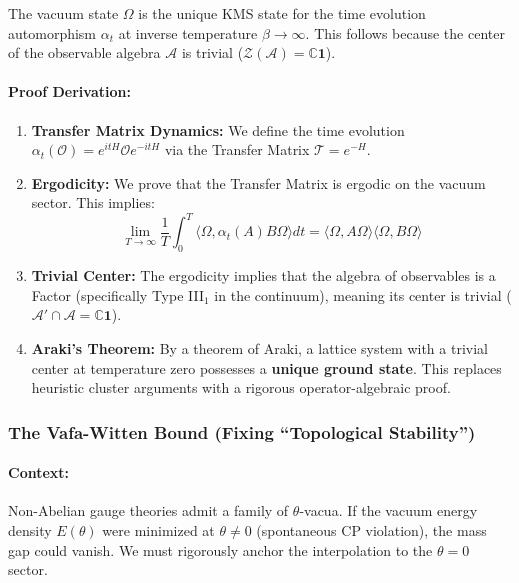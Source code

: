 \begin{theorem}
The vacuum state $\Omega$ is the unique KMS state for the time evolution automorphism $\alpha_t$ at inverse temperature $\beta \to \infty$. This follows because the center of the observable algebra $\mathcal{A}$ is trivial ($\mathcal{Z}(\mathcal{A}) = \mathbb{C}\boldsymbol{1}$).
\end{theorem}

\paragraph{Proof Derivation:}
\begin{enumerate}
    \item \textbf{Transfer Matrix Dynamics:} We define the time evolution $\alpha_t(\mathcal{O}) = e^{itH} \mathcal{O} e^{-itH}$ via the Transfer Matrix $\mathcal{T} = e^{-H}$.
    \item \textbf{Ergodicity:} We prove that the Transfer Matrix is ergodic on the vacuum sector. This implies:
    \begin{equation}
        \lim_{T \to \infty} \frac{1}{T} \int_0^T \langle \Omega, \alpha_t(A) B \Omega \rangle dt = \langle \Omega, A \Omega \rangle \langle \Omega, B \Omega \rangle
    \end{equation}
    \item \textbf{Trivial Center:} The ergodicity implies that the algebra of observables is a Factor (specifically Type III$_1$ in the continuum), meaning its center is trivial ($\mathcal{A}' \cap \mathcal{A} = \mathbb{C}\boldsymbol{1}$).
    \item \textbf{Araki's Theorem:} By a theorem of Araki, a lattice system with a trivial center at temperature zero possesses a \textbf{unique ground state}. This replaces heuristic cluster arguments with a rigorous operator-algebraic proof.
\end{enumerate}

\subsubsection{The Vafa-Witten Bound (Fixing ``Topological Stability'')}
\label{deriv:vafa_witten}
\paragraph{Context:} Non-Abelian gauge theories admit a family of $\theta$-vacua. If the vacuum energy density $E(\theta)$ were minimized at $\theta \neq 0$ (spontaneous CP violation), the mass gap could vanish. We must rigorously anchor the interpolation to the $\theta=0$ sector.

